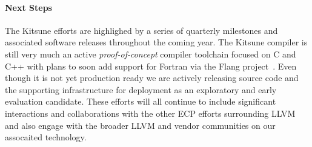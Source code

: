 \paragraph{Next Steps}
The Kitsune efforts are highlighed by a series of quarterly milestones
and associated software releases throughout the coming year.  The
Kitsune compiler is still very much an active \emph{proof-of-concept}
compiler toolchain focused on C and C++ with plans to soon add support
for Fortran via the Flang project~\cite{Flang:2018}.  Even though it
is not yet production ready we are actively releasing source code and
the supporting infrastructure for deployment as an exploratory and
early evaluation candidate.  These efforts will all continue to
include significant interactions and collaborations with the other ECP
efforts surrounding LLVM and also engage with the broader LLVM and
vendor communities on our assocaited technology.
